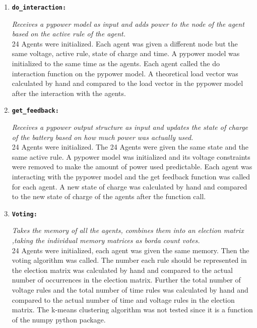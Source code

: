 \documentclass[a4paper]{article}
\begin{document}
\begin{enumerate}
 \item \begin{alltt}\textbf{do_interaction:}\end{alltt}
 \textit{Receives a pypower model as input and adds power to the node of the agent based on the active rule of the agent.}\\
 24 Agents were initialized. Each agent was given a different node but the same voltage, active rule, 
 state of charge and time.  A pypower model was initialized to the same time as the agents. Each agent called 
 the do interaction function on the pypower model. A theoretical load vector was calculated by hand and compared 
 to the load vector in the pypower model after the interaction with the agents. 
 
 \item \begin{alltt}\textbf{get_feedback:}\end{alltt}
 \textit{Receives a pypower output structure as input and updates the state of charge of the battery 
 based on how much power was actually used.} \\
 24 Agents were initialized. The 24 Agents were given the same state and the same active rule. 
 A pypower  model was initialized and its voltage constraints were removed to make the amount of power 
 used predictable. Each agent was interacting with the pypower model and the get feedback function 
 was called for each agent. A new state of charge was calculated by hand and compared to the new state of
 charge of the agents after the function call.
 
 \item \begin{alltt}\textbf{Voting:}\end{alltt}
 \textit{Takes the memory of all the agents, combines them into an election matrix ,taking 
 the individual memory matrices as borda count votes. }\\
 24 Agents were initialized, each agent was given the same memory. Then the voting algorithm was called.  
 The number each rule should be represented in the election matrix was calculated by hand and compared to 
 the actual number of occurrences in the election matrix. Further the total number of voltage rules and the 
 total number of time rules was calculated by hand and compared to the actual number of time and voltage rules 
 in the election matrix. The k-means clustering algorithm was not tested since it is a function of the numpy python package.
\end{enumerate}
\end{document}
